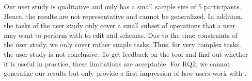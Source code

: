 Our user study is qualitative and only has a small sample size of 5 participants.
Hence, the results are not representative and cannot be generalized.
In addition, the tasks of the user study only cover a small subset of operations
that a user may want to perform with \toolname{} to edit \cfgfiles{} and schemas.
Due to the time constraints of the user study, we only cover rather simple tasks.
Thus, for very complex tasks, the user study is not conclusive.
To get feedback on the tool and find out whether it is useful in practice, these limitations are acceptable.
For RQ2, we cannot generalize our results but only provide a first impression of how users work with \toolname{}.



